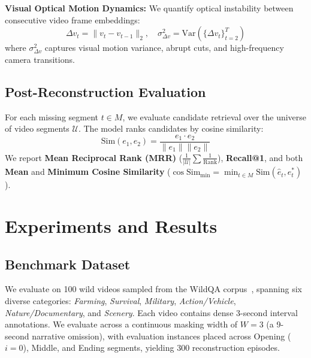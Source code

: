 \documentclass[10pt,twocolumn,letterpaper]{article}
\begin{document}
\noindent \textbf{Visual Optical Motion Dynamics:} We quantify optical instability between consecutive video frame embeddings:
\begin{equation}
    \Delta v_t = \|v_{t} - v_{t-1}\|_2, \quad \sigma^2_{\Delta v} = \text{Var}(\{\Delta v_t\}_{t=2}^T)
\end{equation}
where \(\sigma^2_{\Delta v}\) captures visual motion variance, abrupt cuts, and high-frequency camera transitions.

\subsection{Post-Reconstruction Evaluation}
For each missing segment \(t \in M\), we evaluate candidate retrieval over the universe of video segments \(\mathcal{U}\). The model ranks candidates by cosine similarity:
\begin{equation}
    \text{Sim}(e_1, e_2) = \frac{e_1 \cdot e_2}{\|e_1\| \|e_2\|}
\end{equation}
We report \textbf{Mean Reciprocal Rank (MRR)} (\(\frac{1}{|\mathcal{U}|} \sum \frac{1}{\text{Rank}}\)), \textbf{Recall@1}, and both \textbf{Mean} and \textbf{Minimum Cosine Similarity} (\(\cos\text{Sim}_{\min} = \min_{t \in M} \text{Sim}(\hat{e}_t, e_t^*)\)).

\section{Experiments and Results}
\label{sec:experiments}

\subsection{Benchmark Dataset}
We evaluate on 100 wild videos sampled from the WildQA corpus~\cite{castro-etal-2022-in-the-wild}, spanning six diverse categories: \textit{Farming}, \textit{Survival}, \textit{Military}, \textit{Action/Vehicle}, \textit{Nature/Documentary}, and \textit{Scenery}. Each video contains dense 3-second interval annotations. We evaluate across a continuous masking width of \(W=3\) (a 9-second narrative omission), with evaluation instances placed across Opening (\(i=0\)), Middle, and Ending segments, yielding 300 reconstruction episodes.
\end{document}
